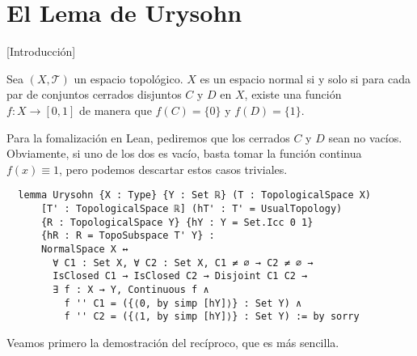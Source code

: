 

\section{El Lema de Urysohn}

[Introducción] 

\begin{theorem}
  Sea $(X, \mathcal{T})$ un espacio topológico. $X$ es un espacio normal si y solo si para cada par de conjuntos cerrados disjuntos $C$ y $D$ en $X$, existe una función $f : X \to [0, 1]$ de manera que $f(C) = \{0\}$ y $f(D) = \{1\}$.
\end{theorem}

Para la fomalización en Lean, pediremos que los cerrados $C$ y $D$ sean no vacíos. Obviamente, si uno de los dos es vacío, basta tomar la función continua $f(x) \equiv 1$, pero podemos descartar estos casos triviales.

\begin{lstlisting}
  lemma Urysohn {X : Type} {Y : Set ℝ} (T : TopologicalSpace X)
      [T' : TopologicalSpace ℝ] (hT' : T' = UsualTopology)
      {R : TopologicalSpace Y} {hY : Y = Set.Icc 0 1}
      {hR : R = TopoSubspace T' Y} :
      NormalSpace X ↔
        ∀ C1 : Set X, ∀ C2 : Set X, C1 ≠ ∅ → C2 ≠ ∅ →
        IsClosed C1 → IsClosed C2 → Disjoint C1 C2 →
        ∃ f : X → Y, Continuous f ∧
          f '' C1 = ({⟨0, by simp [hY]⟩} : Set Y) ∧
          f '' C2 = ({⟨1, by simp [hY]⟩} : Set Y) := by sorry
\end{lstlisting}

Veamos primero la demostración del recíproco, que es más sencilla.


